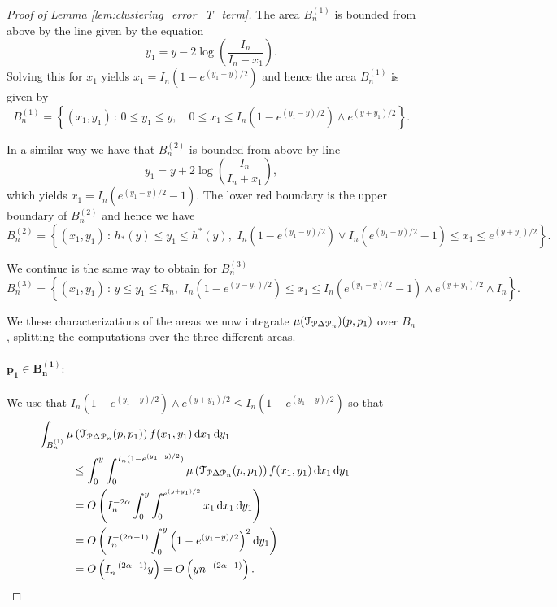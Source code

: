 \begin{proof}[Proof of Lemma \ref{lem:clustering_error_T_term}]
The area $B_n^{(1)}$ is bounded from above by the line given by the equation
\[
	y_1 = y - 2\log\left(\frac{I_n}{I_n - x_1}\right).
\]
Solving this for $x_1$ yields $x_1 = I_n\left(1 - e^{(y_1-y)/2}\right)$ and hence the area $B_n^{(1)}$ is given by
\[
	B_n^{(1)} = \left\{(x_1, y_1) \, : \, 0 \le y_1 \le y, \quad 0 \le x_1 \le I_n\left(1 - e^{(y_1-y)/2}\right) \wedge e^{(y + y_1)/2} \right\}.
\]

In a similar way we have that $B_n^{(2)}$ is bounded from above by line
\[
	y_1 = y + 2\log\left(\frac{I_n}{I_n + x_1}\right),
\]
which yields $x_1 = I_n\left(e^{(y_1 - y)/2} - 1\right)$. The lower red boundary is the upper boundary of $B_n^{(2)}$ and hence we have
\[
	B_n^{(2)} = \left\{(x_1, y_1) \, : \, h_\ast(y) \le y_1 \le h^\ast(y), \,\, I_n\left(1 - e^{(y_1-y)/2}\right) \vee 
	I_n\left(e^{(y_1 - y)/2} - 1\right) \le x_1 \le e^{(y + y_1)/2} \right\}.
\]

We continue is the same way to obtain for $B_n^{(3)}$
\[
	B_n^{(3)} = \left\{(x_1, y_1) \, : \, y \le y_1 \le R_n, \,\,
	I_n\left(1 - e^{(y - y_1)/2}\right) \le x_1 \le I_n\left(e^{(y_1 - y)/2} - 1\right) \wedge e^{(y + y_1)/2} \wedge I_n \right\}.
\]

We these characterizations of the areas we now integrate $\mu(\mathcal{T}_{{\mathcal P} \Delta {\mathcal P}_n})(p,p_1)$ over $B_n$, splitting the computations over the three different areas.

\paragraph{$\bm{p_1 \in B_n^{(1)}}:$}

We use that $I_n\left(1 - e^{(y_1-y)/2}\right) \wedge e^{(y + y_1)/2} \le I_n\left(1 - e^{(y_1-y)/2}\right)$ so that
\begin{align*}
	&\hspace{-30pt}\int_{B_n^{(1)}} \mu\left(\mathcal{T}_{\Pcal \Delta \Pcal_n}(p,p_1)\right) 
		f(x_1,y_1)	\dd x_1 \dd y_1 \\
	&\le  \int_0^y \int_0^{I_n(1-e^{(y_1-y)/2})} \mu\left(\mathcal{T}_{\Pcal \Delta \Pcal_n}(p,p_1)\right) 
		f(x_1,y_1) \dd x_1 \dd y_1\\
	&= \bigO{ I_n^{-2\alpha} \int_0^y \int_0^{e^{(y+y_1)/2}}  x_1 \dd x_1 \dd y_1 }\\
	&= \bigO{I_n^{-(2\alpha-1)} \int_0^y \left(1 - e^{(y_1-y)/2}\right)^2 \dd y_1} \\
	&= \bigO{I_n^{-(2\alpha - 1)} y} = \bigO{y n^{-(2\alpha - 1)}}.
\end{align*} 


\end{proof}

